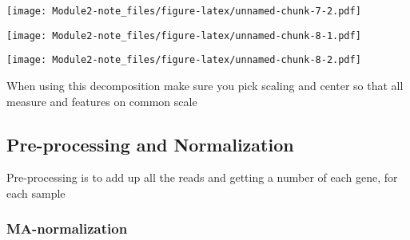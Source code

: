 \documentclass[]{article}
\newenvironment{Shaded}{\begin{snugshade}}{\end{snugshade}}
\newcommand{\KeywordTok}[1]{\textcolor[rgb]{0.13,0.29,0.53}{\textbf{#1}}}
\newcommand{\DataTypeTok}[1]{\textcolor[rgb]{0.13,0.29,0.53}{#1}}
\newcommand{\DecValTok}[1]{\textcolor[rgb]{0.00,0.00,0.81}{#1}}
\newcommand{\StringTok}[1]{\textcolor[rgb]{0.31,0.60,0.02}{#1}}
\newcommand{\CommentTok}[1]{\textcolor[rgb]{0.56,0.35,0.01}{\textit{#1}}}
\newcommand{\OperatorTok}[1]{\textcolor[rgb]{0.81,0.36,0.00}{\textbf{#1}}}
\newcommand{\NormalTok}[1]{#1}
\begin{document}
\texttt{[image: Module2-note\_files/figure-latex/unnamed-chunk-7-2.pdf]}

\begin{Shaded}
\end{Shaded}

\texttt{[image: Module2-note\_files/figure-latex/unnamed-chunk-8-1.pdf]}

\begin{Shaded}
\end{Shaded}

\texttt{[image: Module2-note\_files/figure-latex/unnamed-chunk-8-2.pdf]}

When using this decomposition make sure you pick scaling and center so
that all measure and features on common scale

\subsection{Pre-processing and
Normalization}\label{pre-processing-and-normalization}

Pre-processing is to add up all the reads and getting a number of each
gene, for each sample

\subsubsection{MA-normalization}\label{ma-normalization}
\end{document}
